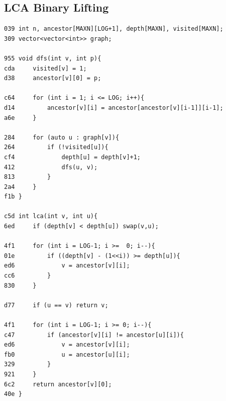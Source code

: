 \documentclass[11pt, a4paper, twoside]{article}
\begin{document}
\subsection{LCA Binary Lifting}
\begin{lstlisting}
039 int n, ancestor[MAXN][LOG+1], depth[MAXN], visited[MAXN];
309 vector<vector<int>> graph;

955 void dfs(int v, int p){
cda     visited[v] = 1;
d38     ancestor[v][0] = p;
    
c64     for (int i = 1; i <= LOG; i++){
d14         ancestor[v][i] = ancestor[ancestor[v][i-1]][i-1];
a6e     }
    
284     for (auto u : graph[v]){
264         if (!visited[u]){
cf4             depth[u] = depth[v]+1;
412             dfs(u, v);
813         }
2a4     }
f1b }

c5d int lca(int v, int u){
6ed     if (depth[v] < depth[u]) swap(v,u);
    
4f1     for (int i = LOG-1; i >=  0; i--){
01e         if ((depth[v] - (1<<i)) >= depth[u]){
ed6             v = ancestor[v][i];
cc6         } 
830     }
    
d77     if (u == v) return v;
    
4f1     for (int i = LOG-1; i >= 0; i--){
c47         if (ancestor[v][i] != ancestor[u][i]){
ed6             v = ancestor[v][i];
fb0             u = ancestor[u][i];
329         }
921     }
6c2     return ancestor[v][0];
40e }


\end{lstlisting}
\end{document}
